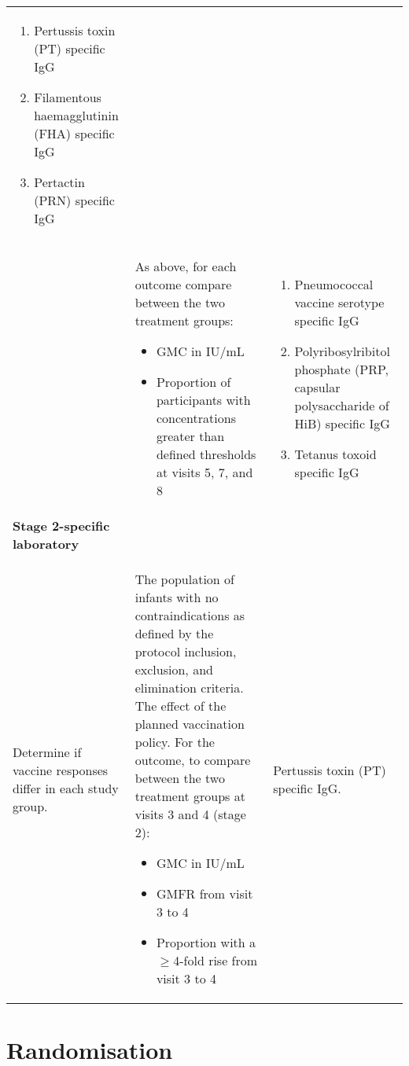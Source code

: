 \documentclass{bmcart}
\begin{document}
\begin{table}[!ht]
\begin{tabular}{p{3cm}p{4.25cm}p{4.25cm}}
		\begin{enumerate}[leftmargin=*, labelsep=-0.1cm]
			\item Pertussis toxin (PT) specific IgG
			\item Filamentous haemagglutinin (FHA) specific IgG
			\item Pertactin (PRN) specific IgG
		\end{enumerate}
		\\
		& 		
		As above, for each outcome compare between the two treatment groups: 
		\begin{itemize}[leftmargin=0.5cm]
			\item GMC in IU/mL
			\item Proportion of participants with concentrations greater than defined thresholds at visits 5, 7, and 8
		\end{itemize} &
		\begin{enumerate}[leftmargin=*, labelsep=-0.1cm]
			\item Pneumococcal vaccine serotype specific IgG
			\item Polyribosylribitol phosphate (PRP, capsular polysaccharide of HiB) specific IgG
			\item Tetanus toxoid specific IgG
		\end{enumerate}
		\\
		\textbf{Stage 2-specific laboratory} & &  \\
		Determine if vaccine responses differ in each study group. &
		The population of infants with no contraindications as defined by the protocol inclusion, exclusion, and elimination criteria. \newline 
		The effect of the planned vaccination policy.\newline
		For the outcome, to compare between the two treatment groups at visits 3 and 4 (stage 2):
		\begin{itemize}[leftmargin=0.5cm]
			\item GMC in IU/mL
			\item GMFR from visit 3 to 4
			\item Proportion with a $\geq$4-fold rise from visit 3 to 4
		\end{itemize} &
		Pertussis toxin (PT) specific IgG.
		\\
		\hline
		\hline
	\end{tabular}
\end{table}


\section*{Randomisation}
\end{document}
